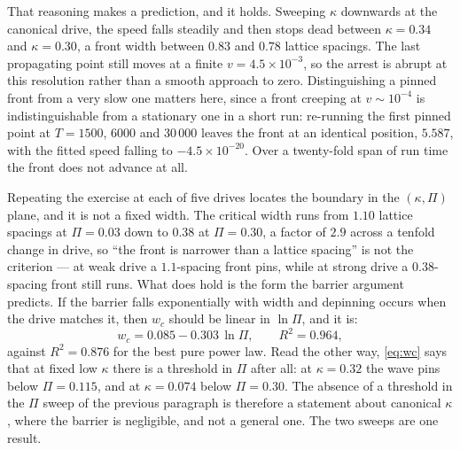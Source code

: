 
That reasoning makes a prediction, and it holds. Sweeping $\kappa$ downwards at
the canonical drive, the speed falls steadily and then stops dead between
$\kappa = 0.34$ and $\kappa = 0.30$, a front width between $0.83$ and $0.78$
lattice spacings. The last propagating point still moves at a finite
$v = 4.5\times10^{-3}$, so the arrest is abrupt at this resolution rather than a
smooth approach to zero. Distinguishing a pinned front from a very slow one
matters here, since a front creeping at $v \sim 10^{-4}$ is indistinguishable from
a stationary one in a short run: re-running the first pinned point at $T = 1500$,
$6000$ and $30\,000$ leaves the front at an identical position, $5.587$, with the
fitted speed falling to $-4.5\times10^{-20}$. Over a twenty-fold span of run time
the front does not advance at all.

Repeating the exercise at each of five drives locates the boundary in the
$(\kappa,\Pi)$ plane, and it is not a fixed width. The critical width runs from
$1.10$ lattice spacings at $\Pi = 0.03$ down to $0.38$ at $\Pi = 0.30$, a factor
of $2.9$ across a tenfold change in drive, so ``the front is narrower than a
lattice spacing'' is not the criterion --- at weak drive a $1.1$-spacing front
pins, while at strong drive a $0.38$-spacing front still runs. What does hold is
the form the barrier argument predicts. If the barrier falls exponentially with
width and depinning occurs when the drive matches it, then $w_c$ should be linear
in $\ln\Pi$, and it is:
%
\begin{equation}
  w_c = 0.085 - 0.303\,\ln\Pi, \qquad R^2 = 0.964,
  \label{eq:wc}
\end{equation}
%
against $R^2 = 0.876$ for the best pure power law. Read the other way,
\eqref{eq:wc} says that at fixed low $\kappa$ there is a threshold in $\Pi$ after
all: at $\kappa = 0.32$ the wave pins below $\Pi = 0.115$, and at $\kappa = 0.074$
below $\Pi = 0.30$. The absence of a threshold in the $\Pi$ sweep of the previous
paragraph is therefore a statement about canonical $\kappa$, where the barrier is
negligible, and not a general one. The two sweeps are one result.

